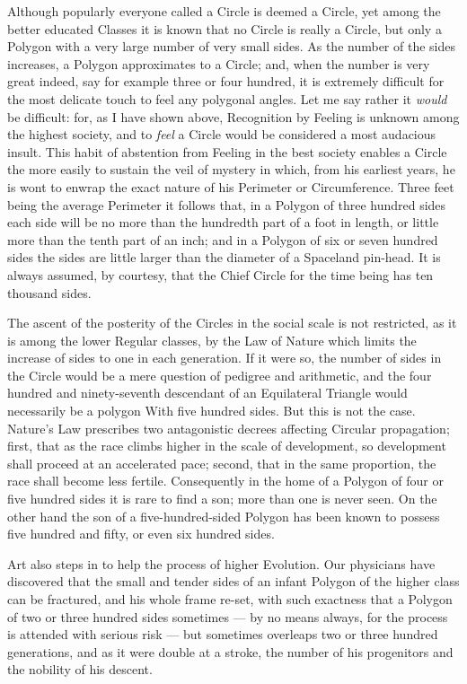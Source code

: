 \documentclass[10pt, kindle, oneside]{kindle}
\begin{document}
Although popularly everyone called a Circle is deemed a Circle, yet among the
better educated Classes it is known that no Circle is really a Circle, but
only a Polygon with a very large number of very small sides. As the number of
the sides increases, a Polygon approximates to a Circle; and, when the number
is very great indeed, say for example three or four hundred, it is extremely
difficult for the most delicate touch to feel any polygonal angles. Let me say
rather it \emph{would} be difficult: for, as I have shown above, Recognition by
Feeling is unknown among the highest society, and to \emph{feel} a Circle would be
considered a most audacious insult. This habit of abstention from Feeling in
the best society enables a Circle the more easily to sustain the veil of
mystery in which, from his earliest years, he is wont to enwrap the exact
nature of his Perimeter or Circumference. Three feet being the average
Perimeter it follows that, in a Polygon of three hundred sides each side will
be no more than the hundredth part of a foot in length, or little more than
the tenth part of an inch; and in a Polygon of six or seven hundred sides the
sides are little larger than the diameter of a Spaceland pin-head. It is
always assumed, by courtesy, that the Chief Circle for the time being has ten
thousand sides.

The ascent of the posterity of the Circles in the social scale is not
restricted, as it is among the lower Regular classes, by the Law of Nature
which limits the increase of sides to one in each generation. If it were so,
the number of sides in the Circle would be a mere question of pedigree and
arithmetic, and the four hundred and ninety-seventh descendant of an
Equilateral Triangle would necessarily be a polygon With five hundred sides.
But this is not the case. Nature's Law prescribes two antagonistic decrees
affecting Circular propagation; first, that as the race climbs higher in the
scale of development, so development shall proceed at an accelerated pace;
second, that in the same proportion, the race shall become less fertile.
Consequently in the home of a Polygon of four or five hundred sides it is rare
to find a son; more than one is never seen. On the other hand the son of a
five-hundred-sided Polygon has been known to possess five hundred and fifty,
or even six hundred sides.

Art also steps in to help the process of higher Evolution. Our physicians have
discovered that the small and tender sides of an infant Polygon of the higher
class can be fractured, and his whole frame re-set, with such exactness that a
Polygon of two or three hundred sides sometimes --- by no means always, for the
process is attended with serious risk --- but sometimes overleaps two or three
hundred generations, and as it were double at a stroke, the number of his
progenitors and the nobility of his descent.
\end{document}

